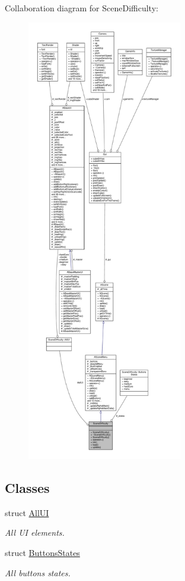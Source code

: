 Collaboration diagram for Scene\+Difficulty\+:
\nopagebreak
\begin{figure}[H]
\begin{center}
\leavevmode
\includegraphics[height=550pt]{class_scene_difficulty__coll__graph}
\end{center}
\end{figure}
\subsection*{Classes}
\begin{DoxyCompactItemize}
\item 
struct \hyperlink{struct_scene_difficulty_1_1_all_u_i}{All\+UI}
\begin{DoxyCompactList}\small\item\em All UI elements. \end{DoxyCompactList}\item 
struct \hyperlink{struct_scene_difficulty_1_1_buttons_states}{Buttons\+States}
\begin{DoxyCompactList}\small\item\em All buttons states. \end{DoxyCompactList}\end{DoxyCompactItemize}
